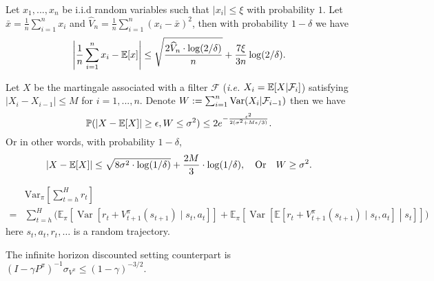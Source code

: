 \begin{lemma}\label{lem:empirical_bernstein_ineq}
	Let $x_1,...,x_n$ be i.i.d random variables such that $|x_i|\leq \xi$ with probability $1$. Let $\bar{x}=\frac{1}{n}\sum_{i=1}^nx_i$ and $\widehat{V}_n=\frac{1}{n}\sum_{i=1}^n(x_i-\bar{x})^2$, then with probability $1-\delta$ we have 
	$$
	\left|\frac{1}{n}\sum_{i=1}^n x_i-\mathbb{E}[x]\right|\leq \sqrt{\frac{2\widehat{V}_n\cdot\log(2/\delta)}{n}}+\frac{7\xi}{3n}\log(2/\delta).
	$$
\end{lemma}







\begin{lemma}\label{lem:freedman}
	Let $X$ be the martingale associated with a filter $\mathcal{F}$ (\textit{i.e.} $X_i=\mathbb{E}[X|\mathcal{F}_i]$) satisfying $|X_i-X_{i-1}|\leq M$ for $i=1,...,n$. Denote $W:=\sum_{i=1}^n\mathrm{Var}(X_i|\mathcal{F}_{i-1})$  then we have 
	\[
	\mathbb{P}(|X-\mathbb{E}[X]|\geq\epsilon,W\leq \sigma^2)\leq 2 e^{-\frac{\epsilon^2}{2(\sigma^2+M\epsilon/3)}}.
	\]
	Or in other words, with probability $1-\delta$,
	\[
	|X-\mathbb{E}[X]|\leq \sqrt{{8\sigma^2\cdot\log(1/\delta)}}+\frac{2M}{3}\cdot\log(1/\delta), \quad\text{Or} \quad W\geq \sigma^2.
	\]
\end{lemma}




\begin{lemma}\label{lem:H3toH2}
	
	
	\begin{align*}
	&\mathrm{Var}_{\pi}\left[\sum_{t=h}^{H} r_{t}\right]\\
	=&\sum_{t=h}^{H}\Bigg(\mathbb{E}_{\pi}\left[\operatorname{Var}\left[r_{t}+V_{t+1}^{\pi}\left(s_{t+1}\right) \mid s_{t}, a_{t}\right] \right]
	+\mathbb{E}_{\pi}\left[\operatorname{Var}\left[\mathbb{E}\left[r_{t}+V_{t+1}^{\pi}\left(s_{t+1}\right) \mid s_{t}, a_{t}\right] \middle| s_{t}\right] \right]\Bigg)
	\end{align*}
	here $s_t,a_t,r_t,\ldots$ is a random trajectory.
\end{lemma}

\begin{remark}
	The infinite horizon discounted setting counterpart is $(I-\gamma P^\pi)^{-1}\sigma_{V^\pi}\leq (1-\gamma)^{-3/2}$.
\end{remark}



